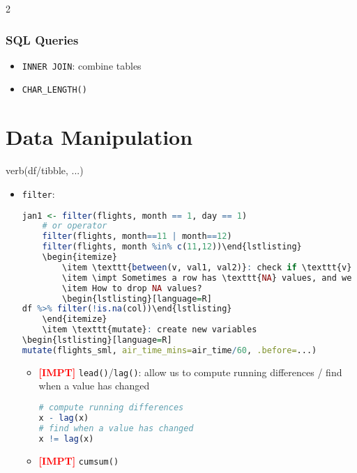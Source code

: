 \documentclass{article}
\newcommand{\impt}[0]{\textcolor{red}{\textbf{[IMPT] }}}
\begin{document}
\begin{multicols}{2}
\subsubsection{SQL Queries}
\begin{itemize}
	\item \texttt{INNER JOIN}: combine tables
	\item \texttt{CHAR\_LENGTH()}
\end{itemize}

\section{Data Manipulation}
\begin{center}
	verb(df/tibble, ...)
\end{center}
\begin{itemize}
	\item \texttt{filter}:
	\begin{lstlisting}[language=R]
	jan1 <- filter(flights, month == 1, day == 1)
	# or operator
	filter(flights, month==11 | month==12)
	filter(flights, month %in% c(11,12))\end{lstlisting}
	\begin{itemize}
		\item \texttt{between(v, val1, val2)}: check if \texttt{v} is between the 2 values
		\item \impt Sometimes a row has \texttt{NA} values, and we can include the row to alter the data later using \texttt{is.na(x)}
		\item How to drop NA values?
		\begin{lstlisting}[language=R]
df %>% filter(!is.na(col))\end{lstlisting}
	\end{itemize}
	\item \texttt{mutate}: create new variables
\begin{lstlisting}[language=R]
mutate(flights_sml, air_time_mins=air_time/60, .before=...)\end{lstlisting}
\begin{itemize}
	\item \impt \texttt{lead()}/\texttt{lag()}: allow us to compute running differences / find when a value has changed
	\begin{lstlisting}[language=R]
# compute running differences
x - lag(x)
# find when a value has changed
x != lag(x)\end{lstlisting}
    \item \impt \texttt{cumsum()}

\end{itemize}
\end{itemize}
\end{multicols}
\end{document}
